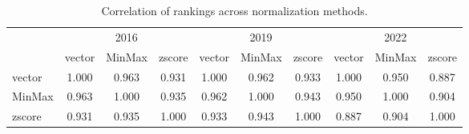 \documentclass{article}
\begin{document}
\begin{table}[H]
\centering
\caption{Correlation of rankings across normalization methods.\label{tab:norm-corr}}
\small
\begin{tabular}{l*{9}{c}}
\toprule
 & \multicolumn{3}{c}{2016} & \multicolumn{3}{c}{2019} & \multicolumn{3}{c}{2022} \\
\cmidrule(lr){2-4}\cmidrule(lr){5-7}\cmidrule(lr){8-10}
 & vector & MinMax & zscore & vector & MinMax & zscore & vector & MinMax & zscore \\
\midrule
vector & 1.000 & 0.963 & 0.931 & 1.000 & 0.962 & 0.933 & 1.000 & 0.950 & 0.887 \\
MinMax & 0.963 & 1.000 & 0.935 & 0.962 & 1.000 & 0.943 & 0.950 & 1.000 & 0.904 \\
zscore & 0.931 & 0.935 & 1.000 & 0.933 & 0.943 & 1.000 & 0.887 & 0.904 & 1.000 \\
\bottomrule
\end{tabular}
\end{table}
\end{document}
